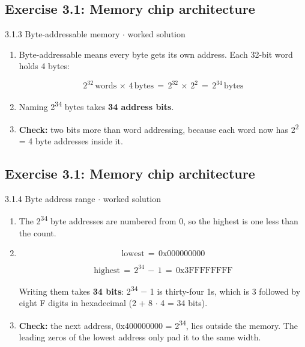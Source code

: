 \documentclass[11pt]{article}
\begin{document}
\begin{keepsection}\subsection{Exercise 3.1: Memory chip architecture}

\begin{workedbox}{3.1.3 Byte-addressable memory \ensuremath{\cdot} worked solution}
\begin{enumerate}
\item {}
Byte-addressable means every byte gets its own address. Each 32-bit word holds 4 bytes:

\begin{equation*}2^{32}\, \text{words}\, \times \, 4\, \text{bytes}\, =\, 2^{32}\, \times \, 2^{2}\, =\, 2^{34}\, \text{bytes}\end{equation*}
\item Naming 2\textsuperscript{34} bytes takes \textbf{34 address bits}.
\item \textbf{Check:} two bits more than word addressing, because each word now has 2\textsuperscript{2} = 4 byte addresses inside it.
\end{enumerate}
\end{workedbox}

\end{keepsection}
\begin{keepsection}\subsection{Exercise 3.1: Memory chip architecture}

\begin{workedbox}{3.1.4 Byte address range \ensuremath{\cdot} worked solution}
\begin{enumerate}
\item The 2\textsuperscript{34} byte addresses are numbered from 0, so the highest is one less than the count.
\item {}
\begin{equation*}\text{lowest}\, =\, 0\mathrm{x}000000000\end{equation*}

\begin{equation*}\text{highest}\, =\, 2^{34}\, -\, 1\, =\, 0\mathrm{x}3\text{FFFFFFFF}\end{equation*}

Writing them takes \textbf{34 bits}: 2\textsuperscript{34} \ensuremath{-} 1 is thirty-four 1s, which is 3 followed by eight F digits in hexadecimal (2 + 8 \ensuremath{\cdot} 4 = 34 bits).
\item \textbf{Check:} the next address, 0x400000000 = 2\textsuperscript{34}, lies outside the memory. The leading zeros of the lowest address only pad it to the same width.
\end{enumerate}
\end{workedbox}

\end{keepsection}
\end{document}
